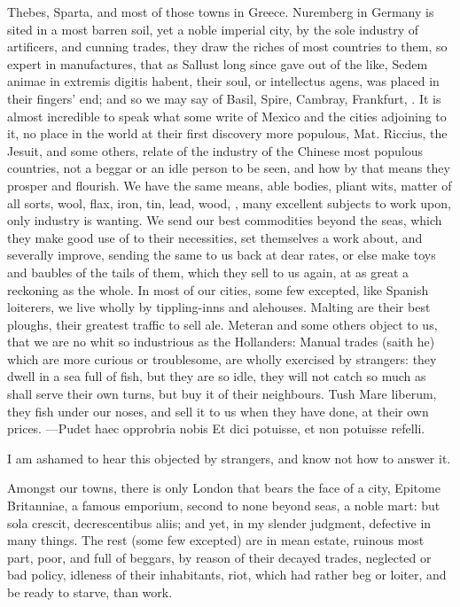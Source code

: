 {Thebes, Sparta, and most of those towns in Greece. Nuremberg in Germany
is sited in a most barren soil, yet a noble imperial city, by the sole
industry of artificers, and cunning trades, they draw the riches of
most countries to them, so expert in manufactures, that as Sallust long
since gave out of the like, Sedem animae in extremis digitis habent,
their soul, or intellectus agens, was placed in their fingers' end; and
so we may say of Basil, Spire, Cambray, Frankfurt, \etc{}. It is almost
incredible to speak what some write of Mexico and the cities adjoining
to it, no place in the world at their first discovery more populous,
Mat. Riccius, the Jesuit, and some others, relate of the industry
of the Chinese most populous countries, not a beggar or an idle person
to be seen, and how by that means they prosper and flourish. We have
the same means, able bodies, pliant wits, matter of all sorts, wool,
flax, iron, tin, lead, wood, \etc{}, many excellent subjects to work upon,
only industry is wanting. We send our best commodities beyond the seas,
which they make good use of to their necessities, set themselves a work
about, and severally improve, sending the same to us back at dear
rates, or else make toys and baubles of the tails of them, which they
sell to us again, at as great a reckoning as the whole. In most of our
cities, some few excepted, like Spanish loiterers, we live wholly
by tippling-inns and alehouses. Malting are their best ploughs, their
greatest traffic to sell ale. Meteran and some others object to
us, that we are no whit so industrious as the Hollanders: Manual trades
(saith he) which are more curious or troublesome, are wholly exercised
by strangers: they dwell in a sea full of fish, but they are so idle,
they will not catch so much as shall serve their own turns, but buy it
of their neighbours. Tush Mare liberum, they fish under our noses,
and sell it to us when they have done, at their own prices.
---Pudet haec opprobria nobis
Et dici potuisse, et non potuisse refelli.

I am ashamed to hear this objected by strangers, and know not how to
answer it.

Amongst our towns, there is only London that bears the face of a
city, Epitome Britanniae, a famous emporium, second to none beyond
seas, a noble mart: but sola crescit, decrescentibus aliis; and yet, in
my slender judgment, defective in many things. The rest (some few
excepted) are in mean estate, ruinous most part, poor, and full of
beggars, by reason of their decayed trades, neglected or bad policy,
idleness of their inhabitants, riot, which had rather beg or loiter,
and be ready to starve, than work.

}
